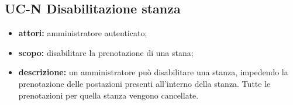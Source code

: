 \subsection{UC-N Disabilitazione stanza}
\begin{itemize}
    \item \textbf{attori:} amministratore autenticato;
    \item \textbf{scopo:} disabilitare la prenotazione di una stana;
    \item \textbf{descrizione:} un amministratore pu\`{o} disabilitare una stanza, impedendo la prenotazione delle postazioni presenti all'interno della stanza. Tutte le prenotazioni per quella stanza vengono cancellate.
\end{itemize}
